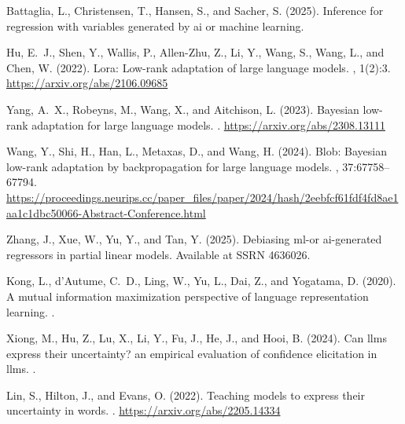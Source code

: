 \documentclass[11pt]{article}
\begin{document}
\begin{thebibliography}{99}

Battaglia, L., Christensen, T., Hansen, S., and Sacher, S. (2025).
\newblock Inference for regression with variables generated by ai or machine learning.

Hu, E.~J., Shen, Y., Wallis, P., Allen-Zhu, Z., Li, Y., Wang, S., Wang, L., and Chen, W. (2022).
\newblock Lora: Low-rank adaptation of large language models.
, 1(2):3.
\newblock \url{https://arxiv.org/abs/2106.09685}

Yang, A.~X., Robeyns, M., Wang, X., and Aitchison, L. (2023).
\newblock Bayesian low-rank adaptation for large language models.
.
\newblock \url{https://arxiv.org/abs/2308.13111}

Wang, Y., Shi, H., Han, L., Metaxas, D., and Wang, H. (2024).
\newblock Blob: Bayesian low-rank adaptation by backpropagation for large language models.
, 37:67758--67794.
\newblock \url{https://proceedings.neurips.cc/paper_files/paper/2024/hash/2eebfcf61fdf4fd8ae1aa1c1dbc50066-Abstract-Conference.html}

Zhang, J., Xue, W., Yu, Y., and Tan, Y. (2025).
\newblock Debiasing ml-or ai-generated regressors in partial linear models.
\newblock Available at SSRN 4636026.

Kong, L., d'Autume, C.~D., Ling, W., Yu, L., Dai, Z., and Yogatama, D. (2020).
\newblock A mutual information maximization perspective of language representation learning.
.

Xiong, M., Hu, Z., Lu, X., Li, Y., Fu, J., He, J., and Hooi, B. (2024).
\newblock Can llms express their uncertainty? an empirical evaluation of confidence elicitation in llms.
.

Lin, S., Hilton, J., and Evans, O. (2022).
\newblock Teaching models to express their uncertainty in words.
.
\newblock \url{https://arxiv.org/abs/2205.14334}

\end{thebibliography}
\end{document}
